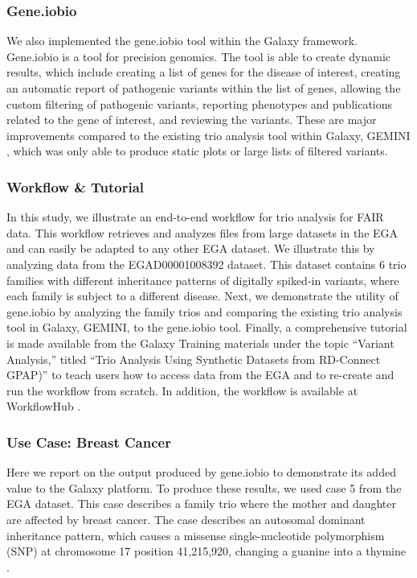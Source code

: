 \subsubsection*{Gene.iobio}
We also implemented the gene.iobio tool within the Galaxy framework. Gene.iobio is a tool for precision genomics. The tool is able to create dynamic results, which include creating a list of genes for the disease of interest, creating an automatic report of pathogenic variants within the list of genes, allowing the custom filtering of pathogenic variants, reporting phenotypes and publications related to the gene of interest, and reviewing the variants. These are major improvements compared to the existing trio analysis tool within Galaxy, GEMINI \cite{gemini}, which was only able to produce static plots or large lists of filtered variants.

\subsubsection*{Workflow \& Tutorial}
In this study, we illustrate an end-to-end workflow for trio analysis for FAIR data. This workflow retrieves and analyzes files from large datasets in the EGA and can easily be adapted to any other EGA dataset. We illustrate this by analyzing data from the EGAD00001008392 \cite{egad} dataset. This dataset contains 6 trio families with different inheritance patterns of digitally spiked-in variants, where each family is subject to a different disease. Next, we demonstrate the utility of gene.iobio by analyzing the family trios and comparing the existing trio analysis tool in Galaxy, GEMINI, to the gene.iobio tool. Finally, a comprehensive tutorial is made available from the Galaxy Training materials \cite{GTN_web} under the topic ``Variant Analysis,'' titled ``Trio Analysis Using Synthetic Datasets from RD-Connect GPAP)'' \cite{tutorial} to teach users how to access data from the EGA and to re-create and run the workflow from scratch. In addition, the workflow is available at WorkflowHub \cite{workflowhub-wf}.

\subsubsection*{Use Case: Breast Cancer}
Here we report on the output produced by gene.iobio to demonstrate its added value to the Galaxy platform. To produce these results, we used case 5 from the EGA dataset. This case describes a family trio where the mother and daughter are affected by breast cancer. The case describes an autosomal dominant inheritance pattern, which causes a missense single-nucleotide polymorphism (SNP) at chromosome 17 position 41,215,920, changing a guanine into a thymine \cite{egad}.

